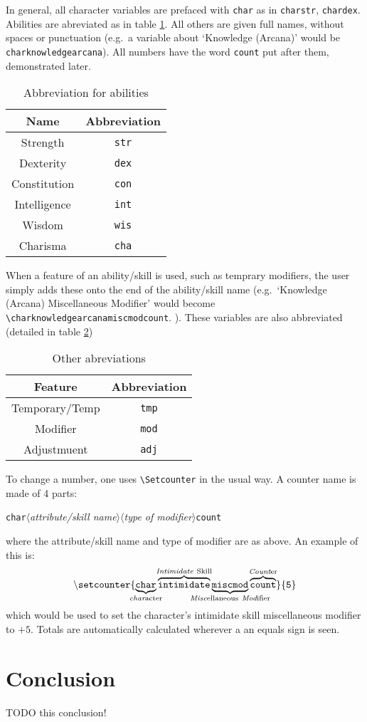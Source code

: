 \documentclass[oneside]{article}
\begin{document}
In general, all character variables are prefaced with \verb=char= as in \verb=charstr=, \verb=chardex=. Abilities are abreviated as in table \ref{tab:abbrev}. All others are given full names, without spaces or punctuation (e.g.\ a variable about `Knowledge (Arcana)' would be \verb=charknowledgearcana=). All numbers have the word \verb=count= put after them, demonstrated later.

\begin{table}[h]
  \centering
  \begin{tabular}{c c }
    Name & Abbreviation\\\hline
    Strength & \verb=str=\\
    Dexterity & \verb=dex=\\
    Constitution & \verb=con=\\
    Intelligence & \verb=int=\\
    Wisdom & \verb=wis=\\
    Charisma & \verb=cha=\\\hline
  \end{tabular}
  \caption{Abbreviation for abilities}
  \label{tab:abbrev}
\end{table}

When a feature of an ability/skill is used, such as temprary modifiers, the user simply adds these onto the end of the ability/skill name (e.g.\ `Knowledge (Arcana) Miscellaneous Modifier' would become \verb=\charknowledgearcanamiscmodcount=. ). These variables are also abbreviated (detailed in table \ref{tab:otherabbrev})

\begin{table}[h]
  \centering
  \begin{tabular}{c c }
    Feature & Abbreviation \\\hline
    Temporary/Temp & \verb=tmp=\\
    Modifier & \verb=mod=\\
    Adjustmuent & \verb=adj=\\\hline
  \end{tabular}
  \caption{Other abreviations}
  \label{tab:otherabbrev}
\end{table}

To change a number, one uses \verb=\Setcounter= in the usual way. A counter name is made of 4 parts:
\protect\parbox{\linewidth}{\texttt{char}$\langle$\emph{attribute/skill name}$\rangle\langle$\emph{type of modifier}$\rangle$\texttt{count}}
where the attribute/skill name and type of modifier are as above. An example of this is:
\[
\mathtt{\backslash setcounter\{\underbrace{\mathtt{char}}_{\mathclap{\mathrm{\emph{char}acter}}}\overbrace{\mathtt{intimidate}}^{\mathclap{\mathrm{\emph{Intimidate}\ Skill}}}\underbrace{\mathtt{miscmod}}_{\mathclap{\mathrm{\emph{Misc}ellaneous\ \emph{Mod}ifier}}}\overbrace{\mathtt{count}}^{\mathclap{\mathrm{\emph{Count}er}}}\}\{5\}}
\]
which would be used to set the character's intimidate skill miscellaneous modifier to $+5$. Totals are automatically calculated wherever a an equals sign is seen.

\section{Conclusion}
\label{sec:conclusion}

TODO this conclusion!
\end{document}
